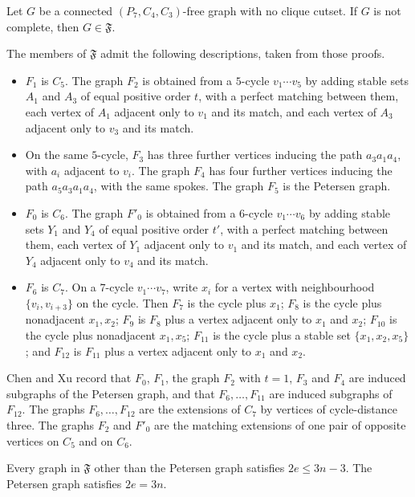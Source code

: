 \documentclass[ASNA]{USG}
\theoremstyle{WBstyletwo}
\numberwithin{equation}{section}
\begin{document}
\begin{lemma}\label{lem:chenxu}
Let $G$ be a connected $(P_7,C_4,C_3)$-free graph with no clique cutset. If $G$ is not complete, then $G\in\mathfrak F$.
\end{lemma}

The members of $\mathfrak F$ admit the following descriptions, taken from those proofs.

\begin{itemize}
\item $F_1$ is $C_5$. The graph $F_2$ is obtained from a $5$-cycle $v_1\cdots v_5$ by adding stable sets $A_1$ and $A_3$ of equal positive order $t$, with a perfect matching between them, each vertex of $A_1$ adjacent only to $v_1$ and its match, and each vertex of $A_3$ adjacent only to $v_3$ and its match.
\item On the same $5$-cycle, $F_3$ has three further vertices inducing the path $a_3a_1a_4$, with $a_i$ adjacent to $v_i$. The graph $F_4$ has four further vertices inducing the path $a_5a_3a_1a_4$, with the same spokes. The graph $F_5$ is the Petersen graph.
\item $F_0$ is $C_6$. The graph $F'_0$ is obtained from a $6$-cycle $v_1\cdots v_6$ by adding stable sets $Y_1$ and $Y_4$ of equal positive order $t'$, with a perfect matching between them, each vertex of $Y_1$ adjacent only to $v_1$ and its match, and each vertex of $Y_4$ adjacent only to $v_4$ and its match.
\item $F_6$ is $C_7$. On a $7$-cycle $v_1\cdots v_7$, write $x_i$ for a vertex with neighbourhood $\{v_i,v_{i+3}\}$ on the cycle. Then $F_7$ is the cycle plus $x_1$; $F_8$ is the cycle plus nonadjacent $x_1,x_2$; $F_9$ is $F_8$ plus a vertex adjacent only to $x_1$ and $x_2$; $F_{10}$ is the cycle plus nonadjacent $x_1,x_5$; $F_{11}$ is the cycle plus a stable set $\{x_1,x_2,x_5\}$; and $F_{12}$ is $F_{11}$ plus a vertex adjacent only to $x_1$ and $x_2$.
\end{itemize}

Chen and Xu record that $F_0$, $F_1$, the graph $F_2$ with $t=1$, $F_3$ and $F_4$ are induced subgraphs of the Petersen graph, and that $F_6,\dots,F_{11}$ are induced subgraphs of $F_{12}$. The graphs $F_6,\dots,F_{12}$ are the extensions of $C_7$ by vertices of cycle-distance three. The graphs $F_2$ and $F'_0$ are the matching extensions of one pair of opposite vertices on $C_5$ and on $C_6$.

\begin{lemma}\label{lem:fcount}
Every graph in $\mathfrak F$ other than the Petersen graph satisfies $2e\le 3n-3$. The Petersen graph satisfies $2e=3n$.
\end{lemma}
\end{document}
